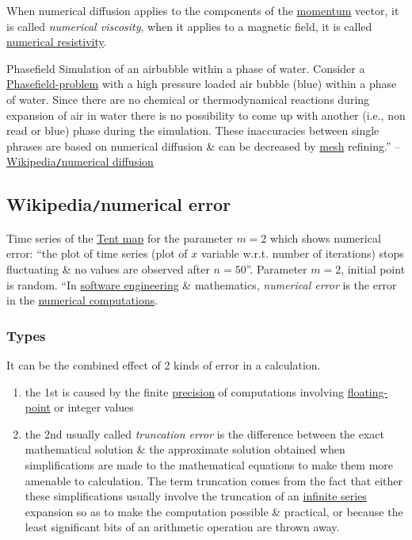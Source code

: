 \documentclass{article}
\begin{document}
When numerical diffusion applies to the components of the \href{https://en.wikipedia.org/wiki/Momentum}{momentum} vector, it is called {\it numerical viscosity}, when it applies to a magnetic field, it is called \href{https://en.wikipedia.org/wiki/Numerical_resistivity}{numerical resistivity}.

{\sf Phasefield Simulation of an airbubble within a phase of water.} Consider a \href{https://en.wikipedia.org/wiki/Phase_field_models}{Phasefield-problem} with a high pressure loaded air bubble (blue) within a phase of water. Since there are no chemical or thermodynamical reactions during expansion of air in water there is no possibility to come up with another (i.e., non read or blue) phase during the simulation. These inaccuracies between single phrases are based on numerical diffusion \& can be decreased by \href{https://en.wikipedia.org/wiki/Polygon_mesh}{mesh} refining.'' -- \href{https://en.wikipedia.org/wiki/Numerical_diffusion}{Wikipedia{\tt/}numerical diffusion}


\subsection{Wikipedia{\tt/}numerical error}
{\sf Time series of the \href{https://en.wikipedia.org/wiki/Tent_map}{Tent map} for the parameter $m = 2$ which shows numerical error: ``the plot of time series (plot of $x$ variable w.r.t. number of iterations) stops fluctuating \& no values are observed after $n = 50$''. Parameter $m = 2$, initial point is random.} ``In \href{https://en.wikipedia.org/wiki/Software_engineering}{software engineering} \& mathematics, {\it numerical error} is the error in the \href{https://en.wikipedia.org/wiki/Numerical_computation}{numerical computations}.

\subsubsection{Types}
It can be the combined effect of 2 kinds of error in a calculation.
\begin{enumerate}
	\item the 1st is caused by the finite \href{https://en.wikipedia.org/wiki/Precision_(computer_science)}{precision} of computations involving \href{https://en.wikipedia.org/wiki/Floating-point}{floating-point} or integer values
	\item the 2nd usually called {\it truncation error} is the difference between the exact mathematical solution \& the approximate solution obtained when simplifications are made to the mathematical equations to make them more amenable to calculation. The term truncation comes from the fact that either these simplifications usually involve the truncation of an \href{https://en.wikipedia.org/wiki/Infinite_series}{infinite series} expansion so as to make the computation possible \& practical, or because the least significant bits of an arithmetic operation are thrown away.
\end{enumerate}
\end{document}
